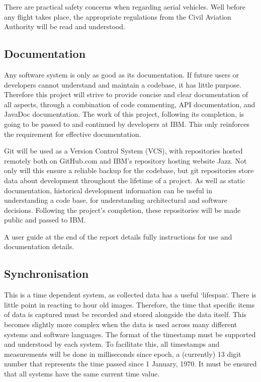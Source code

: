 \documentclass{article}
\begin{document}
There are practical safety concerns when regarding aerial vehicles. Well before any flight takes place, the appropriate regulations from the Civil Aviation Authority will be read and understood.

\subsection{Documentation}
Any software system is only as good as its documentation. If future users or developers cannot understand and maintain a codebase, it has little purpose. Therefore this project will strive to provide concise and clear documentation of all aspects, through a combination of code commenting, API documentation, and JavaDoc documentation. The work of this project, following its completion, is going to be passed to and continued by developers at IBM. This only reinforces the requirement for effective documentation.

Git will be used as a Version Control System (VCS), with repositories hosted remotely both on GitHub.com and IBM's repository hosting website Jazz\cite{jazz}. Not only will this ensure a reliable backup for the codebase, but git repositories store data about development throughout the lifetime of a project. As well as static documentation, historical development information can be useful in understanding a code base, for understanding architectural and software decisions\cite{crimeScene}. Following the project's completion, these repositories will be made public and passed to IBM.

A user guide at the end of the report details fully instructions for use and documentation details.

\subsection{Synchronisation}
This is a time dependent system, as collected data has a useful `lifespan`. There is little point in reacting to hour old images. Therefore, the time that specific items of data is captured must be recorded and stored alongside the data itself. This becomes slightly more complex when the data is used across many different systems and software languages. The format of the timestamp must be supported and understood by each system. To facilitate this, all timestamps and measurements will be done in milliseconds since epoch, a (currently) 13 digit number that represents the time passed since 1 January, 1970. It must be ensured that all systems have the same current time value.
\end{document}
